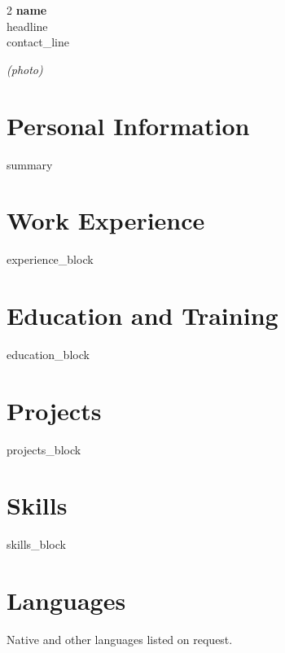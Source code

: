 \documentclass[11pt,a4paper]{article}
\begin{document}
\begin{paracol}{2}
{\Huge\bfseries\color{europass} {{name}}}\\[4pt]
{\large {{headline}}}\\[6pt]
{\small {{contact_line}}}
\switchcolumn
\begin{flushright}
  \color{muted}\small\itshape (photo)
\end{flushright}
\end{paracol}

\vspace{6pt}

\section*{Personal Information}
{{summary}}

\section*{Work Experience}
{{experience_block}}

\section*{Education and Training}
{{education_block}}

\section*{Projects}
{{projects_block}}

\section*{Skills}
{{skills_block}}

\section*{Languages}
Native and other languages listed on request.
\end{document}
